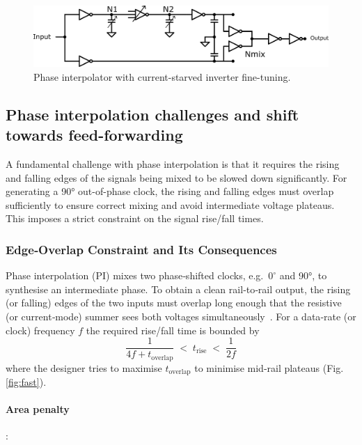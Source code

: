 \begin{figure}[H]
  \centering
  \includegraphics[width=0.8\linewidth]{figures/Schematics/clock_generation_half_CSI.png}
  \caption{Phase interpolator with current-starved inverter fine-tuning.}
  \label{fig:PI_csi_schematic}
\end{figure}

\subsection{Phase interpolation challenges and shift towards feed-forwarding}\label{sec:PI_challenges}

A fundamental challenge with phase interpolation is that it requires the rising and falling edges of the signals being mixed to be slowed down significantly. For generating a \ang{90} out-of-phase clock, the rising and falling edges must overlap sufficiently to ensure correct mixing and avoid intermediate voltage plateaus. This imposes a strict constraint on the signal rise/fall times. 

\subsubsection{Edge‑Overlap Constraint and Its Consequences}

Phase interpolation (PI) mixes two phase‑shifted clocks, e.g.\ $0^{\circ}$ and
\ang{90}, to synthesise an intermediate phase.  To obtain a clean
rail‑to‑rail output, the rising (or falling) edges of the two inputs must
overlap long enough that the resistive (or current‑mode) summer sees
both voltages simultaneously \cite{Razavi2023PI}.  For a data‑rate (or clock)
frequency $f$ the required rise/fall time is bounded by
%
\begin{equation}
{\;
     \frac{1}{4f+t_{\text{overlap}}} 
     \;<\; t_{\text{rise}} 
     \;<\; \frac{1}{2f}
     \;}
\label{eq:overlap}
\end{equation}
%
where the designer tries to maximise $t_{\text{overlap}}$ to minimise
mid‑rail plateaus (Fig.\,\ref{fig:fast}).

\paragraph{Area penalty}:

